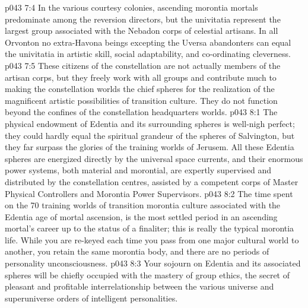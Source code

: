 \vs p043 7:4 In the various courtesy colonies, ascending morontia mortals predominate among the reversion directors, but the univitatia represent the largest group associated with the Nebadon corps of celestial artisans. In all Orvonton no extra\hyp{}Havona beings excepting the Uversa abandonters can equal the univitatia in artistic skill, social adaptability, and co\hyp{}ordinating cleverness.
\vs p043 7:5 These citizens of the constellation are not actually members of the artisan corps, but they freely work with all groups and contribute much to making the constellation worlds the chief spheres for the realization of the magnificent artistic possibilities of transition culture. They do not function beyond the confines of the constellation headquarters worlds.
\vs p043 8:1 The physical endowment of Edentia and its surrounding spheres is well\hyp{}nigh perfect; they could hardly equal the spiritual grandeur of the spheres of Salvington, but they far surpass the glories of the training worlds of Jerusem. All these Edentia spheres are energized directly by the universal space currents, and their enormous power systems, both material and morontial, are expertly supervised and distributed by the constellation centres, assisted by a competent corps of Master Physical Controllers and Morontia Power Supervisors.
\vs p043 8:2 The time spent on the 70 training worlds of transition morontia culture associated with the Edentia age of mortal ascension, is the most settled period in an ascending mortal’s career up to the status of a finaliter; this is really the typical morontia life. While you are re\hyp{}keyed each time you pass from one major cultural world to another, you retain the same morontia body, and there are no periods of personality unconsciousness.
\vs p043 8:3 Your sojourn on Edentia and its associated spheres will be chiefly occupied with the mastery of group ethics, the secret of pleasant and profitable interrelationship between the various universe and superuniverse orders of intelligent personalities.
